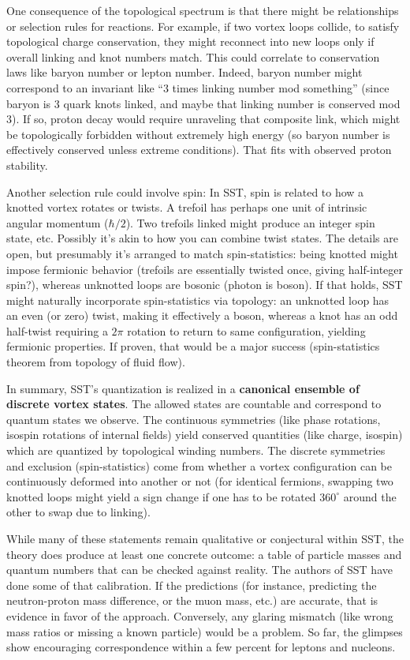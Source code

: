 \documentclass[10pt,reprint,aps,onecolumn,nofootinbib]{revtex4-2}
\begin{document}
One consequence of the topological spectrum is that there might be relationships or selection rules for reactions. For example, if two vortex loops collide, to satisfy topological charge conservation, they might reconnect into new loops only if overall linking and knot numbers match. This could correlate to conservation laws like baryon number or lepton number. Indeed, baryon number might correspond to an invariant like ``3 times linking number mod something'' (since baryon is 3 quark knots linked, and maybe that linking number is conserved mod 3). If so, proton decay would require unraveling that composite link, which might be topologically forbidden without extremely high energy (so baryon number is effectively conserved unless extreme conditions). That fits with observed proton stability.

Another selection rule could involve spin: In SST, spin is related to how a knotted vortex rotates or twists. A trefoil has perhaps one unit of intrinsic angular momentum ($\hbar/2$). Two trefoils linked might produce an integer spin state, etc. Possibly it’s akin to how you can combine twist states. The details are open, but presumably it’s arranged to match spin-statistics: being knotted might impose fermionic behavior (trefoils are essentially twisted once, giving half-integer spin?), whereas unknotted loops are bosonic (photon is boson). If that holds, SST might naturally incorporate spin-statistics via topology: an unknotted loop has an even (or zero) twist, making it effectively a boson, whereas a knot has an odd half-twist requiring a $2\pi$ rotation to return to same configuration, yielding fermionic properties. If proven, that would be a major success (spin-statistics theorem from topology of fluid flow).

In summary, SST’s quantization is realized in a \textbf{canonical ensemble of discrete vortex states}. The allowed states are countable and correspond to quantum states we observe. The continuous symmetries (like phase rotations, isospin rotations of internal fields) yield conserved quantities (like charge, isospin) which are quantized by topological winding numbers. The discrete symmetries and exclusion (spin-statistics) come from whether a vortex configuration can be continuously deformed into another or not (for identical fermions, swapping two knotted loops might yield a sign change if one has to be rotated $360^\circ$ around the other to swap due to linking).

While many of these statements remain qualitative or conjectural within SST, the theory does produce at least one concrete outcome: a table of particle masses and quantum numbers that can be checked against reality. The authors of SST have done some of that calibration. If the predictions (for instance, predicting the neutron-proton mass difference, or the muon mass, etc.) are accurate, that is evidence in favor of the approach. Conversely, any glaring mismatch (like wrong mass ratios or missing a known particle) would be a problem. So far, the glimpses show encouraging correspondence within a few percent for leptons and nucleons.
\end{document}
